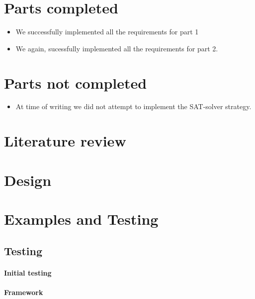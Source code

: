 \documentclass[british]{article}
\title{}
\author{170008773}
\date{\today}
\begin{document}
\maketitle


\section{Parts completed}
\label{completed}
\begin{itemize}
\item We successfully implemented all the requirements for part 1
\item We again, sucessfully implemented all the requirements for part 2.
\end{itemize}

\section{Parts not completed}
\label{uncompleted}
\begin{itemize}
\item At time of writing we did not attempt to implement the SAT-solver strategy.
\end{itemize}

\section{Literature review}
\label{litrev}
\cite{Russell2014}
 
\section{Design}
\label{design}

\section{Examples and Testing}
\label{sec:testing}
 
\subsection{Testing}
\label{subsec:testing}
\paragraph{Initial testing}

\paragraph{Framework}
\end{document}
